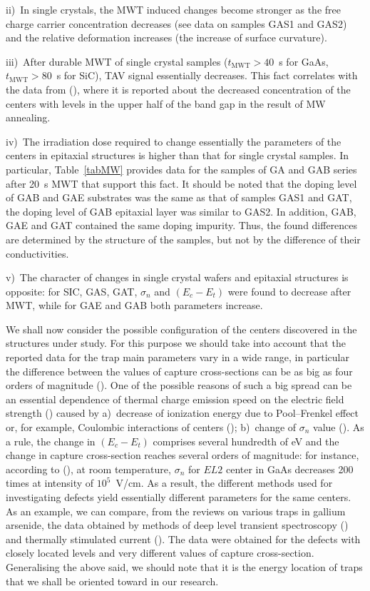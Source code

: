 \documentclass[final,3p,times,twocolumn,authoryear]{elsarticle}
\begin{document}
\noindent
ii)~In single crystals, the  MWT induced changes become stronger as the free charge carrier concentration decreases
(see data on samples GAS1 and GAS2) and the relative deformation increases (the increase of surface curvature).

\noindent
iii)~After durable MWT of single crystal samples ($t_\mathrm{MWT}>40$~s for GaAs,  $t_\mathrm{MWT}>80$~s for SiC),
TAV signal essentially decreases.
This fact correlates with the data  from (\cite{Belyaev1998JTFEn}),
where it is reported about  the decreased concentration of the centers with levels in the upper half of the band gap in the result of MW annealing.

\noindent
iv)~The irradiation dose required to change essentially the parameters of the centers in epitaxial structures is higher than that for single crystal samples.
In particular, Table~\ref{tabMW} provides  data for the samples of GA and GAB series after 20~s MWT
that support this fact.
It should be noted that the doping level of  GAB and GAE substrates was the same as that of samples GAS1 and GAT,
the doping level of GAB epitaxial layer was similar to GAS2.
In addition, GAB, GAE and GAT contained the same doping impurity.
Thus, the found differences are determined by the structure of the samples, but not by the difference of their conductivities.

\noindent
v)~The character of changes in single crystal wafers and epitaxial structures is opposite:
for SІC, GAS, GAT, $\sigma_n$ and $(E_c-E_t)$ were found to decrease after MWT,
while for GAE and GAB both parameters increase.

We shall now consider the possible configuration of the centers discovered in the structures under study.
For this purpose we should take into account that the reported data for the trap main parameters vary in a wide range,
in particular the difference between the values of capture cross-sections can be as big as four orders of magnitude (\cite{Pavlovic2000}).
One of the possible reasons of such a big spread can be an essential dependence
of thermal charge emission speed on  the electric field strength (\cite{Bulyarskii2000,Makram}) caused by
a)~decrease of ionization energy due to Pool--Frenkel effect or, for example, Coulombic interactions of centers (\cite{Stellmacher});
b)~change of $\sigma_n$  value (\cite{Bourgoin2001}).
As a rule, the change in $(E_c-E_t)$ comprises several hundredth of eV and
the change in capture cross-section reaches several orders of magnitude:
for instance, according to (\cite{Bourgoin2001}), at room temperature, 
$\sigma_n$  for $EL2$ center in GaAs decreases 200 times
at intensity of $10^5$~V/cm.
As a result, the different methods used for investigating defects yield essentially different parameters for the same centers.
As an example, we can compare, from the reviews on various traps in gallium arsenide,
the data  obtained by methods of deep level transient spectroscopy (\cite{Bourgoin:GaAs})
and thermally stimulated current (\cite{Pavlovic2000}).
The data were obtained for the defects with closely located levels and very different values of capture cross-section.
Generalising the above said, we should note that it is the energy location of traps that we shall be oriented toward in our research.
\end{document}

